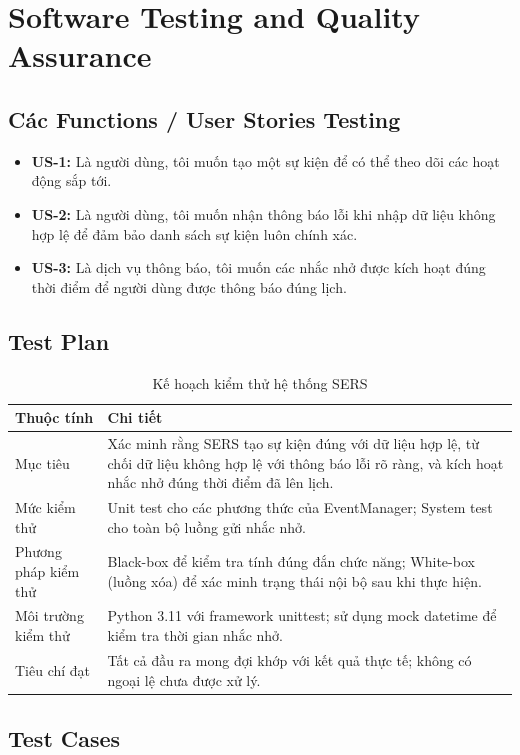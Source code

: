 \section{Software Testing and Quality Assurance}
\subsection{Các Functions / User Stories Testing}
\begin{itemize}
    \item \textbf{US-1:} Là người dùng, tôi muốn tạo một sự kiện để có thể theo dõi các hoạt động sắp tới.
    \item \textbf{US-2:} Là người dùng, tôi muốn nhận thông báo lỗi khi nhập dữ liệu không hợp lệ để đảm bảo danh sách sự kiện luôn chính xác.
    \item \textbf{US-3:} Là dịch vụ thông báo, tôi muốn các nhắc nhở được kích hoạt đúng thời điểm để người dùng được thông báo đúng lịch.
\end{itemize}
\subsection{Test Plan}
\begin{table}[H]
\centering
\begin{tabularx}{\linewidth}{|l|X|}
\hline
\textbf{Thuộc tính} & \textbf{Chi tiết} \\
\hline
Mục tiêu & Xác minh rằng SERS tạo sự kiện đúng với dữ liệu hợp lệ, từ chối dữ liệu không hợp lệ với thông báo lỗi rõ ràng, và kích hoạt nhắc nhở đúng thời điểm đã lên lịch. \\
\hline
Mức kiểm thử & Unit test cho các phương thức của EventManager; System test cho toàn bộ luồng gửi nhắc nhở. \\
\hline
Phương pháp kiểm thử & Black-box để kiểm tra tính đúng đắn chức năng; White-box (luồng xóa) để xác minh trạng thái nội bộ sau khi thực hiện. \\
\hline
Môi trường kiểm thử & Python 3.11 với framework unittest; sử dụng mock datetime để kiểm tra thời gian nhắc nhở. \\
\hline
Tiêu chí đạt & Tất cả đầu ra mong đợi khớp với kết quả thực tế; không có ngoại lệ chưa được xử lý. \\
\hline
\end{tabularx}
\caption{Kế hoạch kiểm thử hệ thống SERS}
\end{table}
\subsection{Test Cases}

